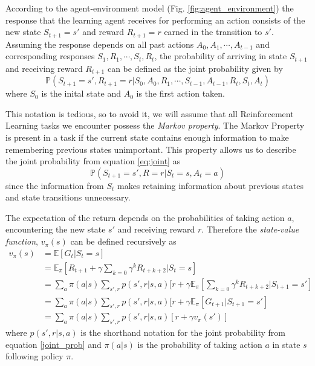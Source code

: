 \documentclass[11pt]{article}
\begin{document}
According to the agent-environment model (Fig. \ref{fig:agent_environment}) the response that
the learning agent receives for performing an action consists
of the new state $S_{t+1} = s'$ and reward $R_{t+1} = r$ earned in the transition
to $s'$.
Assuming the response depends on all past actions $A_{0}, A_{1}, \cdots, A_{t-1}$ and
corresponding responses $S_{1}, R_{1}, \cdots, S_{t}, R_{t}$, the probability
of arriving in state $S_{t+1}$ and receiving reward $R_{t+1}$ can be defined as the
joint probability given by
\begin{equation}\label{eq:joint}
    \mathds{P}(S_{t+1} = s', R_{t+1} = r | S_0, A_0, R_1, \cdots, S_{t-1}, A_{t-1}, R_{t}, S_{t}, A_{t})
\end{equation}
where $S_0$ is the inital state and $A_0$ is the first action taken.

This notation is tedious, so to avoid it, we will assume that all Reinforcement Learning tasks
we encounter possess the \textit{Markov property}.
The Markov Property is present in a task if the current state contains
enough information to make remembering previous states unimportant.
This property allows us to describe the joint probability from equation \ref{eq:joint}
as
\begin{equation}\label{joint_prob}
    \mathds{P}(S_{t+1} = s', R = r | S_t = s, A_t = a)
\end{equation}
since the information from $S_t$ makes retaining information about previous states
and state transitions unnecessary.

The expectation of the return depends on the probabilities of taking action $a$,
encountering the new state $s'$ and receiving reward $r$.
Therefore the \textit{state-value function}, $v_\pi(s)$ can be defined recursively as
\begin{equation}
    \begin{aligned}
        v_\pi(s) &= \mathds{E}[ G_t | S_t = s]\\
        & = \mathds{E}_\pi[R_{t+1} + \gamma \sum\limits_{k=0} \gamma^k R_{t+k+2} | S_t = s]\\
        & = \sum\limits_{a} \pi(a|s) \sum\limits_{s', r} p(s', r | s, a) [r + \gamma \mathds{E}_\pi[\sum\limits_{k=0} \gamma^k R_{t+k+2} | S_{t+1} = s']\\
        & =  \sum\limits_{a} \pi(a|s) \sum\limits_{s', r} p(s', r | s, a) [r + \gamma \mathds{E}_\pi[G_{t+1} | S_{t+1} = s']\\
        & =   \sum\limits_{a} \pi(a|s) \sum\limits_{s', r} p(s', r | s, a) [r + \gamma v_\pi(s')]
    \end{aligned}
\end{equation}
where $p(s', r | s, a)$ is the shorthand notation for the joint probability from equation \ref{joint_prob} and $\pi(a|s)$ is the
probability of taking action $a$ in state $s$ following policy $\pi$.

%
%
\end{document}
